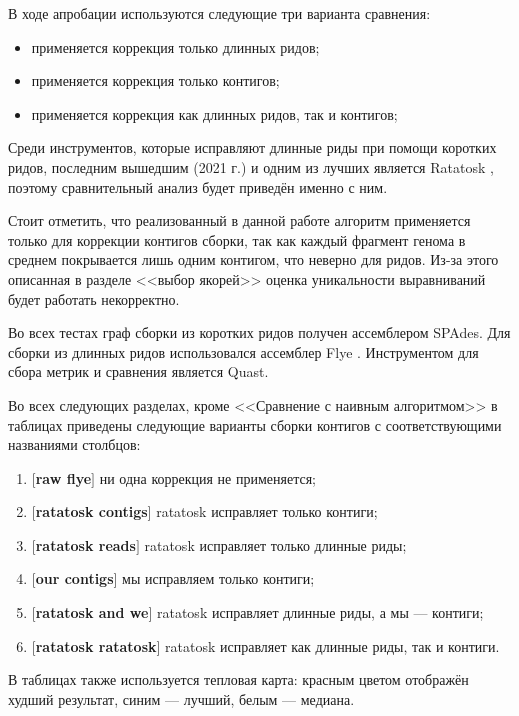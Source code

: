 \documentclass[14pt]{matmex-diploma-custom}
\begin{document}
В ходе апробации используются следующие три варианта сравнения:
\begin{itemize}
    \item применяется коррекция только длинных ридов;
    \item применяется коррекция только контигов;
    \item применяется коррекция как длинных ридов, так и контигов;
\end{itemize}

Среди инструментов, которые исправляют длинные риды при помощи коротких ридов, последним вышедшим (2021 г.) и одним из лучших является Ratatosk \cite{art:holley2021ratatosk, art:zhang2020comprehensive, art:fu2019comparative}, поэтому сравнительный анализ будет приведён именно с ним.

Стоит отметить, что реализованный в данной работе алгоритм применяется только для коррекции контигов сборки, так как каждый фрагмент генома в среднем покрывается лишь одним контигом, что неверно для ридов. Из-за этого описанная в разделе <<выбор якорей>> оценка уникальности выравниваний будет работать некорректно.

Во всех тестах граф сборки из коротких ридов получен ассемблером SPAdes. Для сборки из длинных ридов использовался ассемблер Flye \cite{art:flye}. Инструментом для сбора метрик и сравнения является Quast.

Во всех следующих разделах, кроме <<Сравнение с наивным алгоритмом>> в таблицах приведены следующие варианты сборки контигов с соответствующими названиями столбцов:
\begin{enumerate}
    \item $[$\textbf{raw flye}$]$ ни одна коррекция не применяется;
    \item $[$\textbf{ratatosk contigs}$]$ ratatosk исправляет только контиги;
    \item $[$\textbf{ratatosk reads}$]$ ratatosk исправляет только длинные риды;
    \item $[$\textbf{our contigs}$]$ мы исправляем только контиги;
    \item $[$\textbf{ratatosk and we}$]$ ratatosk исправляет длинные риды, а мы --- контиги;
    \item $[$\textbf{ratatosk ratatosk}$]$ ratatosk исправляет как длинные риды, так и контиги.
\end{enumerate}

В таблицах также используется тепловая карта: красным цветом отображён худший результат, синим --- лучший, белым --- медиана. 
\end{document}
